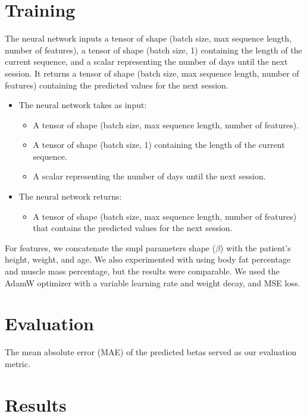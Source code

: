 \section{Training}

The neural network inputs a tensor of shape (batch size, max sequence length,
number of features), a tensor of shape (batch size, 1) containing the length of
the current sequence, and a scalar representing the number of days until the
next session. It returns a tensor of shape (batch size, max sequence length,
number of features) containing the predicted values for the next session.

\begin{itemize}
    \item The neural network takes as input:
          \begin{itemize}
              \item A tensor of shape (batch size, max sequence length, number of features).
              \item A tensor of shape (batch size, 1) containing the length of the current
                    sequence.
              \item A scalar representing the number of days until the next session.
          \end{itemize}
    \item The neural network returns:
          \begin{itemize}
              \item A tensor of shape (batch size, max sequence length, number of features) that
                    contains the predicted values for the next session.
          \end{itemize}
\end{itemize}

For features, we concatenate the \gls{smpl} parameters shape ($\beta$) with the
patient's height, weight, and age. We also experimented with using body fat
percentage and muscle mass percentage, but the results were comparable. We used
the AdamW optimizer with a variable learning rate and weight decay, and MSE
loss.

\section{Evaluation}

The mean absolute error (MAE) of the predicted betas served as our evaluation
metric.

\section{Results}

